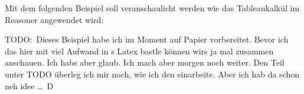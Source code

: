 Mit dem folgenden Beispiel soll veranschaulicht werden wie das Tableaukalkül im Reasoner angewendet wird:

TODO:\ Dieses Beispiel habe ich im Moment auf Papier vorbereitet. Bevor ich das hier mit viel Aufwand in s Latex bastle können wirs ja mal zusammen anschauen. Ich habs aber glaub. Ich mach aber morgen noch weiter. Den Teil unter TODO überleg ich mir noch, wie ich den einarbeite. Aber ich hab da schon neh idee \ldots\:\ D


%
%
%
%
%
%
%
%
